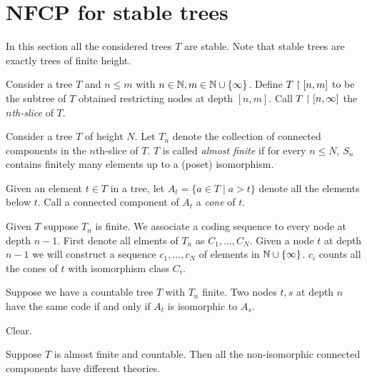 \documentclass{amsart}
\begin{document}
\section{NFCP for stable trees}
In this section all the considered trees $T$ are stable. Note that stable trees are exactly trees of finite height.

\begin{Definition}
Consider a tree $T$ and $n \leq m$ with $n \in \mathbb{N}, m \in \mathbb{N} \cup \{\infty\}$. Define $T \upharpoonright [n,m]$ to be the subtree of $T$ obtained restricting nodes at depth $[n,m]$. Call $T \upharpoonright [n, \infty]$ the \emph{$n$th-slice} of $T$.
\end{Definition}

\begin{Definition}
	Consider a tree $T$ of height $N$. Let $T_n$ denote the collection of connected components in the $n$th-slice of $T$. $T$ is called \emph{almost finite} if for every $n \leq N$, $S_n$ contains finitely many elements up to a (poset) isomorphism.
\end{Definition}

\begin{Definition}
	Given an element $t \in T$ in a tree, let $A_t = \{a \in T \mid a > t\}$ denote all the elements below $t$. Call a connected component of $A_t$ a \emph{cone} of $t$.
\end{Definition}

Given $T$ suppose $T_n$ is finite. We associate a coding sequence to every node at depth $n-1$. First denote all elments of $T_n$ as $C_1, \ldots, C_N$. Given a node $t$ at depth $n-1$ we will construct a sequence $c_1, \ldots, c_N$ of elements in $\mathbb{N} \cup \{\infty\}$. $c_i$ counts all the cones of $t$ with isomorphism class $C_i$.

\begin{Lemma} \label{lm_tree_code}
	Suppose we have a countable tree $T$ with $T_n$ finite. Two nodes $t,s$ at depth $n$ have the same code if and only if $A_t$ is isomorphic to $A_s$.
\end{Lemma}

\begin{Proof}
	Clear.
\end{Proof}

\begin{Lemma} \label{lm_categoricity}
	Suppose $T$ is almost finite and countable. Then all the non-isomorphic connected components have different theories.
\end{Lemma}
\end{document}
